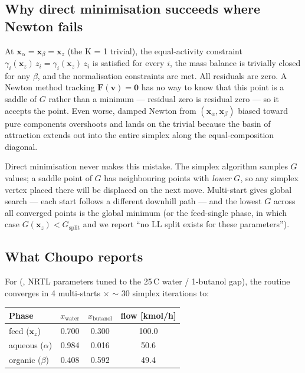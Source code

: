 \documentclass[11pt,a4paper]{article}
\newcommand{\xv}{\mathbf{x}}
\begin{document}
\subsection*{Why direct minimisation succeeds where Newton fails}

At $\xv_\alpha = \xv_\beta = \xv_z$ (the K = 1 trivial), the equal-activity
constraint $\gamma_i(\xv_z)\,z_i = \gamma_i(\xv_z)\,z_i$ is satisfied for
every $i$, the mass balance is trivially closed for any $\beta$, and
the normalisation constraints are met.  All residuals are zero.  A
Newton method tracking $\mathbf{F}(\mathbf{v}) = \mathbf 0$ has no way to know that
this point is a saddle of $G$ rather than a minimum --- residual zero
is residual zero --- so it accepts the point.  Even worse, damped
Newton from $(\xv_\alpha, \xv_\beta)$ biased toward pure components
overshoots and lands on the trivial because the basin of attraction
extends out into the entire simplex along the equal-composition
diagonal.

Direct minimisation never makes this mistake.  The simplex algorithm
samples $G$ values; a saddle point of $G$ has neighbouring points
with \emph{lower} $G$, so any simplex vertex placed there will be
displaced on the next move.  Multi-start gives global search ---
each start follows a different downhill path --- and the lowest $G$
across all converged points is the global minimum (or the feed-single
phase, in which case $G(\xv_z) < G_{\mathrm{split}}$ and we report
``no LL split exists for these parameters'').

\subsection*{What Choupo reports}

For  (, NRTL
parameters tuned to the 25\,\textdegree C water / 1-butanol gap), the routine converges in 4 multi-starts $\times$ \(\sim\) 30 simplex
iterations to:

\begin{center}
\begin{tabular}{lccc}
\toprule
Phase   & \(x_{\mathrm{water}}\) & \(x_{\mathrm{butanol}}\) & flow [kmol/h] \\
\midrule
feed (\(\xv_z\))         & 0.700 & 0.300 & 100.0  \\
aqueous (\(\alpha\))   & 0.984 & 0.016 &  50.6  \\
organic (\(\beta\))    & 0.408 & 0.592 &  49.4  \\
\bottomrule
\end{tabular}
\end{center}
\end{document}
